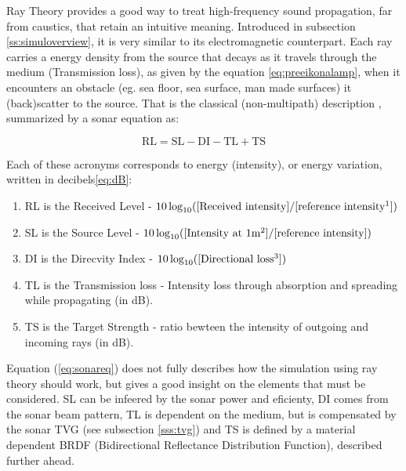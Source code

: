 Ray Theory provides a good way to treat high-frequency sound propagation,
far from caustics, that retain an intuitive meaning. Introduced in subsection
\ref{ss:simuloverview}, it is very similar to its electromagnetic counterpart.
Each ray carries a energy density from the source that decays as it travels
through the medium (Transmission loss), as given by the equation
\ref{eq:preeikonalamp}, when it encounters an obstacle (eg. sea floor, sea
surface, man made surfaces) it (back)scatter to the source. That is the
classical (non-multipath) description
\cite{LURTON,Etter2013,miller2015real,bell1997application}, summarized by a
sonar equation as:

\begin{equation}
\label{eq:sonareq}
\text{RL} = \text{SL} - \text{DI} - \text{TL} + \text{TS}
\end{equation}

Each of these acronyms corresponds to energy (intensity), or energy variation,
written in decibels\ref{eq:dB}:
\begin{enumerate}
  \item RL is the Received Level - $10\log_{10}([\text{Received
  intensity}]/[\text{reference intensity\footnotemark}])$
  \item SL is the Source Level - $10\log_{10}([\text{Intensity at
  1m\footnotemark}]/[\text{reference
  intensity}])$
  \item DI is the Direcvity Index - $10\log_{10}([\text{Directional
  loss\footnotemark}])$
  \item TL is the Transmission loss - Intensity loss through absorption and
  spreading while propagating (in dB).
  \item TS is the Target Strength - ratio bewteen the intensity of outgoing
  and incoming rays (in dB).
\end{enumerate}



Equation (\ref{eq:sonareq}) does not fully describes how the simulation
using ray theory should work, but gives a good insight on the elements that must
be considered. SL can be infeered by the sonar power and eficienty, DI comes
from the sonar beam pattern, TL is dependent on the medium, but is compensated
by the sonar TVG (see subsection \ref{sss:tvg}) and TS is defined by a material
dependent BRDF (Bidirectional Reflectance Distribution Function), described further ahead.

